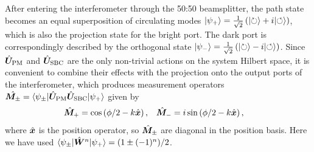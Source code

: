 After entering the interferometer through the 50:50 beamsplitter, the path state becomes an equal superposition of circulating modes $\lvert \psi_+\rangle = \frac{1}{\sqrt{2}}\left(\lvert \circlearrowright\rangle + i\lvert \circlearrowleft\rangle\right)$, which is also the projection state for the bright port.  The dark port is correspondingly described by the orthogonal state $\lvert \psi_-\rangle = \frac{1}{\sqrt{2}}\left(\lvert \circlearrowright\rangle - i\lvert \circlearrowleft\rangle\right)$.  Since $\hat{\bm U}_{\rm PM}$ and $\hat{\bm U}_{\rm SBC}$ are the only non-trivial actions on the system Hilbert space, it is convenient to combine their effects with the projection onto the output ports of the interferometer, which produces measurement operators $\hat{\bm M_\pm} = \langle \psi_\pm \rvert\hat{\bm U}_{\rm PM}\hat{\bm U}_{\rm SBC}\lvert \psi_+\rangle$ given by
\begin{align}\label{eq:collimatedops}
  \hat{\bm M}_+ &= \cos\left(\phi/2 - k\hat{\bm x}\right), &
  \hat{\bm M}_- &= i \sin\left(\phi/2 - k\hat{\bm x}\right),
\end{align}
where $\hat{\bm x}$ is the position operator, so $\hat{\bm M}_\pm$ are diagonal in the position basis.
Here we have used $\langle \psi_\pm \rvert\hat{\bm W}^n\lvert \psi_+\rangle = (1 \pm (-1)^n)/2$.  

